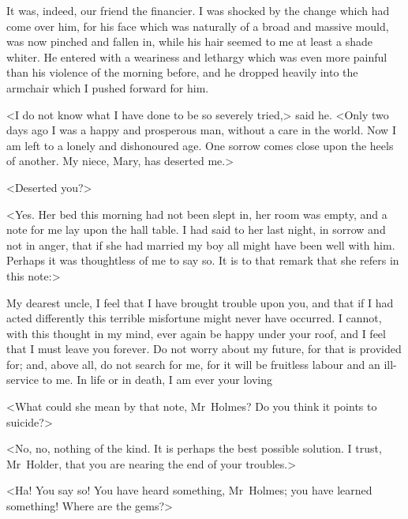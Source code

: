 It was, indeed, our friend the financier. I was shocked by the change which had come over him, for his face which was naturally of a broad and massive mould, was now pinched and fallen in, while his hair seemed to me at least a shade whiter. He entered with a weariness and lethargy which was even more painful than his violence of the morning before, and he dropped heavily into the armchair which I pushed forward for him.

<I do not know what I have done to be so severely tried,> said he. <Only two days ago I was a happy and prosperous man, without a care in the world. Now I am left to a lonely and dishonoured age. One sorrow comes close upon the heels of another. My niece, Mary, has deserted me.>

<Deserted you?>

<Yes. Her bed this morning had not been slept in, her room was empty, and a note for me lay upon the hall table. I had said to her last night, in sorrow and not in anger, that if she had married my boy all might have been well with him. Perhaps it was thoughtless of me to say so. It is to that remark that she refers in this note:>

\begin{letter}
	\vspace{-2em}
	\enlargethispage{\baselineskip}
\end{letter}
\begin{mail}{}{My dearest uncle,}
I feel that I have brought trouble upon you, and that if I had acted differently this terrible misfortune might never have occurred. I cannot, with this thought in my mind, ever again be happy under your roof, and I feel that I must leave you forever. Do not worry about my future, for that is provided for; and, above all, do not search for me, for it will be fruitless labour and an ill-service to me. In life or in death, I am ever your loving
\begin{letter}
	\vspace{-1em}
\end{letter}
\end{mail}

<What could she mean by that note, Mr~Holmes? Do you think it points to suicide?>

<No, no, nothing of the kind. It is perhaps the best possible solution. I trust, Mr~Holder, that you are nearing the end of your troubles.>

<Ha! You say so! You have heard something, Mr~Holmes; you have learned something! Where are the gems?>

